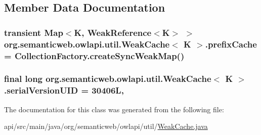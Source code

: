 \subsection{Member Data Documentation}
\hypertarget{classorg_1_1semanticweb_1_1owlapi_1_1util_1_1_weak_cache_3_01_k_01_4_a33b2fe08150a6ce9f022637022771c9c}{
\subsubsection[{prefix\-Cache}]{\setlength{\rightskip}{0pt plus 5cm}transient Map$<$K, Weak\-Reference$<$K$>$ $>$ org.\-semanticweb.\-owlapi.\-util.\-Weak\-Cache$<$ K $>$.prefix\-Cache = {\bf Collection\-Factory.\-create\-Sync\-Weak\-Map}()\hspace{0.3cm}{\ttfamily [private]}}}\label{classorg_1_1semanticweb_1_1owlapi_1_1util_1_1_weak_cache_3_01_k_01_4_a33b2fe08150a6ce9f022637022771c9c}
\hypertarget{classorg_1_1semanticweb_1_1owlapi_1_1util_1_1_weak_cache_3_01_k_01_4_a3aff9d75883dcdad6470743f2cb02aa0}{
\subsubsection[{serial\-Version\-U\-I\-D}]{\setlength{\rightskip}{0pt plus 5cm}final long org.\-semanticweb.\-owlapi.\-util.\-Weak\-Cache$<$ K $>$.serial\-Version\-U\-I\-D = 30406\-L\hspace{0.3cm}{\ttfamily [static]}, {\ttfamily [private]}}}\label{classorg_1_1semanticweb_1_1owlapi_1_1util_1_1_weak_cache_3_01_k_01_4_a3aff9d75883dcdad6470743f2cb02aa0}


The documentation for this class was generated from the following file\-:\begin{DoxyCompactItemize}
\item 
api/src/main/java/org/semanticweb/owlapi/util/\hyperlink{_weak_cache_8java}{Weak\-Cache.\-java}\end{DoxyCompactItemize}
